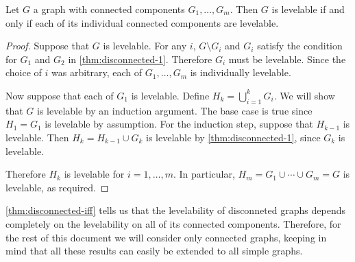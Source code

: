 \begin{theorem} \label{thm:disconnected-iff}
Let $G$ a graph with connected components $G_1, \dots, G_m$. Then $G$ is levelable if and only if each of its individual connected components are levelable.
\end{theorem}

\begin{proof}
Suppose that $G$ is levelable. For any $i$, $G \setminus G_i$ and $G_i$ satisfy the condition for $G_1$ and $G_2$ in \autoref{thm:disconnected-1}. Therefore $G_i$ must be levelable. Since the choice of $i$ was arbitrary, each of $G_1, \dots, G_m$ is individually levelable.

Now suppose that each of $G_1$ is levelable. Define $H_k = \bigcup_{i = 1}^k G_i$. We will show that $G$ is levelable by an induction argument. The base case is true since $H_1 = G_1$ is levelable by assumption. For the induction step, suppose that $H_{k-1}$ is levelable. Then $H_k = H_{k-1} \cup G_k$ is levelable by \autoref{thm:disconnected-1}, since $G_k$ is levelable.

Therefore $H_k$ is levelable for $i = 1, \dots, m$. In particular, $H_m = G_1 \cup \cdots \cup G_m = G$ is levelable, as required.
\end{proof}

\autoref{thm:disconnected-iff} tells us that the levelability of disconneted graphs depends completely on the levelability on all of its connected components. Therefore, for the rest of this document we will consider only connected graphs, keeping in mind that all these results can easily be extended to all simple graphs.